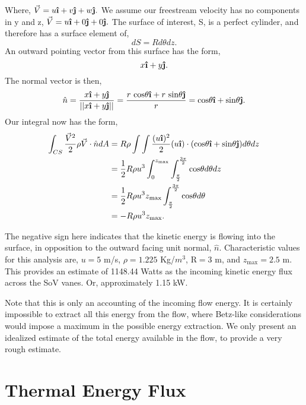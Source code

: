 \documentclass{article}
\newcommand{\uveci}{{\bm{\hat{\textnormal{\bfseries\i}}}}}
\newcommand{\uvecj}{{\bm{\hat{\textnormal{\bfseries\j}}}}}
\begin{document}
Where, $\vec V = u \uveci + v \uvecj + w \uvecj.$ 
We assume our freestream velocity has no components in y and z, 
$\vec V = u \uveci + 0 \uvecj + 0 \uvecj.$ The surface of interest, S,
is a perfect cylinder, and therefore has a surface element of, 
\begin{equation*}
dS = Rd\theta dz. 
\end{equation*}
An outward pointing vector from this surface has the form, 
\begin{equation*}
x \uveci + y \uvecj. 
\end{equation*}
The normal vector is then,
\begin{equation*}
\hat n = \frac{x \uveci + y \uvecj }{||x \uveci + y \uvecj||} =
 \frac{r\text{ cos}\theta \uveci + r\text{ sin}\theta \uvecj}{r} =
 \text{cos}\theta \uveci + \text{sin}\theta \uvecj. 
\end{equation*}
Our integral now has the form, 
\begin{align*}
\int_{CS} \frac{\vec V^2}{2} \rho \vec V \cdot \hat n dA & = R \rho \int
 \int \frac{(u \uveci)^2}{2} (u \uveci) \cdot
 (\text{cos}\theta \uveci + \text{sin}\theta \uvecj) d\theta dz \\
 & = \frac{1}{2} R \rho u^3 \int^{z_\text{max}}_0 \int^{\frac{3\pi}{2}}_{\frac{\pi}{2}} \text{cos}\theta d\theta dz \\
 & = \frac{1}{2} R \rho u^3 z_\text{max}
 \int^{\frac{3\pi}{2}}_{\frac{\pi}{2}} \text{cos}\theta d\theta \\
 & = -R \rho u^3 z_\text{max}. 
\end{align*}

The negative sign here indicates that the kinetic energy is flowing into
the surface, in opposition to the outward facing unit normal, $\hat
n$. Characteristic values for this analysis are, $u = 5$ m/s, $\rho =
1.225$ Kg/$m^3$, R$= 3$ m, and $z_{\text{max}} = 2.5$ m. This provides
an estimate of 1148.44 Watts as the incoming kinetic energy flux across
the SoV vanes. Or, approximately 1.15 kW. 

Note that this is only an accounting of the incoming flow energy. It is certainly
impossible to extract all this energy from the flow, where Betz-like considerations 
would impose a maximum in the possible energy extraction. We only present an idealized
estimate of the total energy available in the flow, to provide a very rough estimate.


\section*{Thermal Energy Flux}
\end{document}
